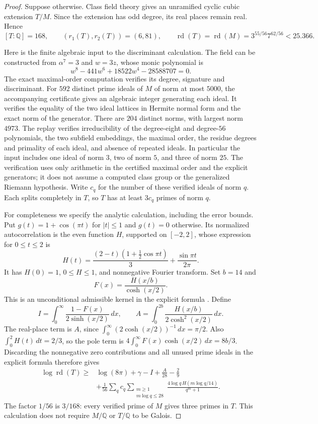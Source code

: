 \begin{proof}
Suppose otherwise. Class field theory gives an unramified cyclic
cubic extension $T/M$. Since the extension has odd degree, its real
places remain real. Hence
\[
 [T:\mathbb Q]=168,\qquad (r_1(T),r_2(T))=(6,81),\qquad
 \operatorname{rd}(T)=\operatorname{rd}(M)
   =3^{55/56}7^{62/56}<25.366.
 \tag{$*$}\label{eq:septic-hilbert-rd}
\]

Here is the finite algebraic input to the discriminant calculation.
The field can be constructed from $\alpha^7=3$ and
$w=3z$, whose monic polynomial is
\[
 w^8-441w^6+18522w^4-28588707=0.
\]
The exact maximal-order computation verifies its degree, signature
and discriminant. For $592$ distinct prime ideals of $M$ of norm
at most $5000$, the accompanying certificate gives an algebraic
integer generating each ideal. It verifies the equality of the
two ideal lattices in Hermite normal form and the exact norm of
the generator. There are $204$ distinct norms, with largest norm
$4973$. The replay verifies irreducibility of the degree-eight
and degree-$56$ polynomials, the two subfield embeddings, the
maximal order, the residue degrees and primality of each ideal,
and absence of repeated ideals. In particular the input includes one ideal of norm $3$,
two of norm $5$, and three of norm $25$.
The verification uses only arithmetic in the certified maximal
order and the explicit generators; it does not assume a computed
class group or the generalized Riemann hypothesis.
Write $c_q$ for the number of these verified ideals of norm $q$.
Each splits completely in $T$, so $T$ has at least $3c_q$ primes
of norm $q$.

For completeness we specify the analytic calculation, including
the error bounds. Put $g(t)=1+\cos(\pi t)$ for $|t|\le1$ and
$g(t)=0$ otherwise. Its normalized autocorrelation is the even
function $H$, supported on $[-2,2]$, whose expression for
$0\le t\le2$ is
\[
 H(t)=\frac{(2-t)(1+\tfrac12\cos\pi t)}3
       +\frac{\sin\pi t}{2\pi}.
\]
It has $H(0)=1$, $0\le H\le1$, and nonnegative Fourier
transform. Set $b=14$ and
\[
 F(x)=\frac{H(x/b)}{\cosh(x/2)}.
\]
This is an unconditional admissible kernel in the explicit formula \citep[Eqs.~(2.3)--(2.4), p.~122]{Odlyzko1990}.
Define
\[
 I=\int_0^\infty\frac{1-F(x)}{2\sinh(x/2)}\,dx,
 \qquad
 A=\int_0^{2b}\frac{H(x/b)}{2\cosh^2(x/2)}\,dx.
\]
The real-place term is $A$, since
$\int_0^\infty(2\cosh(x/2))^{-1}\,dx=\pi/2$.
Also $\int_0^2H(t)\,dt=2/3$, so the pole term is
$4\int_0^\infty F(x)\cosh(x/2)\,dx=8b/3$.
Discarding the nonnegative zero contributions and all unused
prime ideals in the explicit formula therefore gives
\[
\begin{split}
 \log\operatorname{rd}(T)\ge{}&
 \log(8\pi)+\gamma-I+\frac A{28}-\frac29\\
 &+\frac1{56}\sum_q c_q
   \sum_{\substack{m\ge1\\m\log q\le28}}
       \frac{4\log q\,H(m\log q/14)}{q^m+1}.
\end{split}
\tag{$**$}\label{eq:septic-explicit-lower}
\]
The factor $1/56$ is $3/168$: every verified prime of $M$
gives three primes in $T$. This calculation does not require
$M/\mathbb Q$ or $T/\mathbb Q$ to be Galois.


\end{proof}
